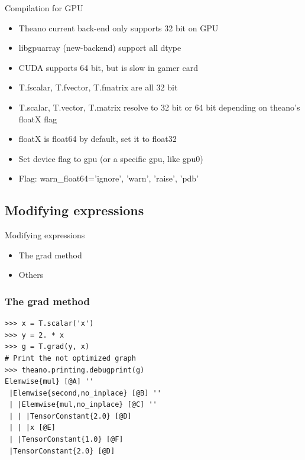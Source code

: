 \documentclass[utf8x,xcolor=pdftex,dvipsnames,table]{beamer}
\begin{document}
\begin{frame}{Compilation for GPU}
  \begin{itemize}
  \item Theano current back-end only supports 32 bit on GPU
  \item libgpuarray (new-backend) support all dtype
  \item CUDA supports 64 bit, but is slow in gamer card
  \item T.fscalar, T.fvector, T.fmatrix are all 32 bit
  \item T.scalar, T.vector, T.matrix resolve to 32 bit or 64 bit depending on theano’s floatX flag
  \item floatX is float64 by default, set it to float32
  \item Set device flag to gpu (or a specific gpu, like gpu0)
  \item Flag: warn\_float64={'ignore', 'warn', 'raise', 'pdb'}
  \end{itemize}
\end{frame}

\subsection{Modifying expressions}
\begin{frame}{Modifying expressions}
  \begin{itemize}
  \item The grad method
  \item Others

  \end{itemize}
\end{frame}

\begin{frame}[fragile]
  \frametitle{The grad method}

\begin{lstlisting}
>>> x = T.scalar('x')
>>> y = 2. * x
>>> g = T.grad(y, x)
# Print the not optimized graph
>>> theano.printing.debugprint(g)
Elemwise{mul} [@A] ''
 |Elemwise{second,no_inplace} [@B] ''
 | |Elemwise{mul,no_inplace} [@C] ''
 | | |TensorConstant{2.0} [@D]
 | | |x [@E]
 | |TensorConstant{1.0} [@F]
 |TensorConstant{2.0} [@D]
\end{lstlisting}
\end{frame}
\end{document}
